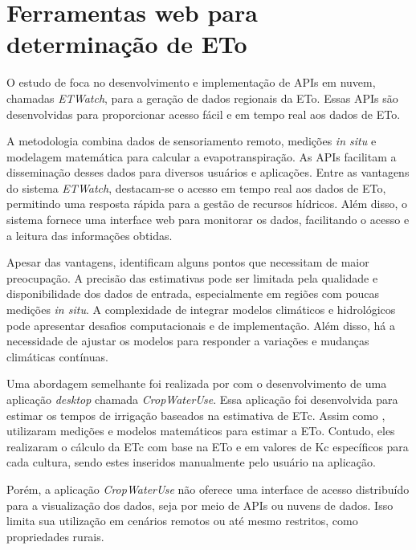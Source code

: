 \section{Ferramentas web para determinação de ETo}

O estudo de \textcite{Fangming_webeva2021} foca no desenvolvimento e implementação de APIs em nuvem, chamadas \textit{ETWatch}, para a geração de dados regionais da ETo. Essas APIs são desenvolvidas para proporcionar acesso fácil e em tempo real aos dados de ETo.

A metodologia combina dados de sensoriamento remoto, medições \textit{in situ} e modelagem matemática para calcular a evapotranspiração. As APIs facilitam a disseminação desses dados para diversos usuários e aplicações. Entre as vantagens do sistema \textit{ETWatch}, destacam-se o acesso em tempo real aos dados de ETo, permitindo uma resposta rápida para a gestão de recursos hídricos. Além disso, o sistema fornece uma interface web para monitorar os dados, facilitando o acesso e a leitura das informações obtidas.

Apesar das vantagens, \textcite{Fangming_webeva2021} identificam alguns pontos que necessitam de maior preocupação. A precisão das estimativas pode ser limitada pela qualidade e disponibilidade dos dados de entrada, especialmente em regiões com poucas medições \textit{in situ}. A complexidade de integrar modelos climáticos e hidrológicos pode apresentar desafios computacionais e de implementação. Além disso, há a necessidade de ajustar os modelos para responder a variações e mudanças climáticas contínuas.

Uma abordagem semelhante foi realizada por \textcite{Jose_webeva2011} com o desenvolvimento de uma aplicação \textit{desktop} chamada \textit{CropWaterUse}. Essa aplicação foi desenvolvida para estimar os tempos de irrigação baseados na estimativa de ETc. Assim como \textcite{Fangming_webeva2021}, \textcite{Jose_webeva2011} utilizaram medições e modelos matemáticos para estimar a ETo. Contudo, eles realizaram o cálculo da ETc com base na ETo e em valores de Kc específicos para cada cultura, sendo estes inseridos manualmente pelo usuário na aplicação.

Porém, a aplicação \textit{CropWaterUse} não oferece uma interface de acesso distribuído para a visualização dos dados, seja por meio de APIs ou nuvens de dados. Isso limita sua utilização em cenários remotos ou até mesmo restritos, como propriedades rurais.

